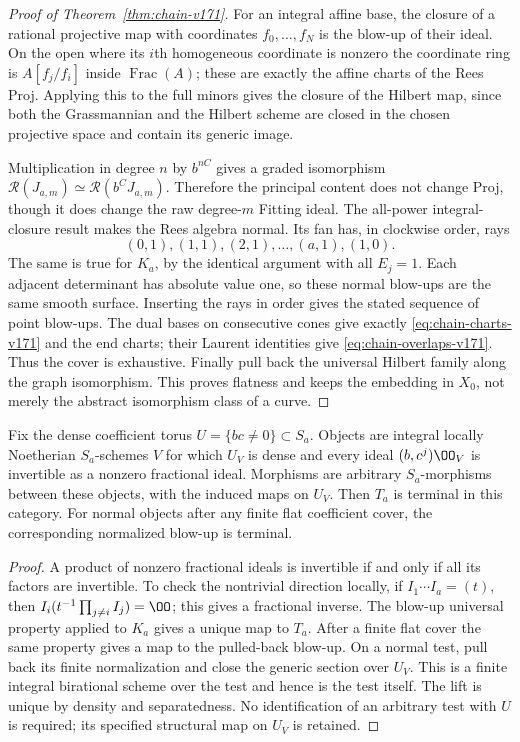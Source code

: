 \begin{proof}[Proof of Theorem~\ref{thm:chain-v171}]
For an integral affine base, the closure of a rational projective map
with coordinates $f_0,\ldots,f_N$ is the blow-up of their ideal.
On the open where its $i$th homogeneous coordinate is nonzero the
coordinate ring is $A[f_j/f_i]$ inside $\operatorname{Frac}(A)$;
these are exactly the affine charts of the Rees Proj. Applying this
to the full minors gives the closure of the Hilbert map, since both
the Grassmannian and the Hilbert scheme are closed in the chosen
projective space and contain its generic image.

Multiplication in degree $n$ by $b^{nC}$ gives a graded isomorphism
$\mathcal R(J_{a,m})\simeq\mathcal R(b^CJ_{a,m})$. Therefore the
principal content does not change Proj, though it does change the
raw degree-$m$ Fitting ideal. The all-power integral-closure result
makes the Rees algebra normal. Its fan has, in clockwise order, rays
\[
 (0,1),(1,1),(2,1),\ldots,(a,1),(1,0).
\]
The same is true for $K_a$, by the identical argument with all
$E_j=1$. Each adjacent determinant has absolute value one, so these
normal blow-ups are the same smooth surface. Inserting the rays in
order gives the stated sequence of point blow-ups. The dual bases
on consecutive cones give exactly \eqref{eq:chain-charts-v171}
and the end charts; their Laurent identities give
\eqref{eq:chain-overlaps-v171}. Thus the cover is exhaustive.
Finally pull back the universal Hilbert family along the graph
isomorphism. This proves flatness and keeps the embedding in $X_0$,
not merely the abstract isomorphism class of a curve.
\end{proof}

\begin{proposition}
\label{prop:chain-category-v171}
Fix the dense coefficient torus $U=\{bc\ne0\}\subset S_a$.
Objects are integral locally Noetherian $S_a$-schemes $V$ for which
$U_V$ is dense and every ideal $(b,c^j)\OO_V$ is invertible as a
nonzero fractional ideal. Morphisms are arbitrary $S_a$-morphisms
between these objects, with the induced maps on $U_V$.
Then $T_a$ is terminal in this category. For normal objects after
any finite flat coefficient cover, the corresponding normalized
blow-up is terminal.
\end{proposition}
\begin{proof}
A product of nonzero fractional ideals is invertible if and only if
all its factors are invertible. To check the nontrivial direction
locally, if $I_1\cdots I_a=(t)$, then
$I_i(t^{-1}\prod_{j\ne i}I_j)=\OO$; this gives a fractional inverse.
The blow-up universal property applied to $K_a$ gives a unique map
to $T_a$. After a finite flat cover the same property gives a map to
the pulled-back blow-up. On a normal test, pull back its finite
normalization and close the generic section over $U_V$. This is a
finite integral birational scheme over the test and hence is the
test itself. The lift is unique by density and separatedness.
No identification of an arbitrary test with $U$ is required; its
specified structural map on $U_V$ is retained.
\end{proof}
